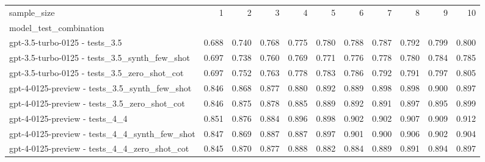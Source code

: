 \begin{tabular}{lrrrrrrrrrr}
\toprule
sample_size & 1 & 2 & 3 & 4 & 5 & 6 & 7 & 8 & 9 & 10 \\
model_test_combination &  &  &  &  &  &  &  &  &  &  \\
\midrule
gpt-3.5-turbo-0125 - tests_3.5 & 0.688 & 0.740 & 0.768 & 0.775 & 0.780 & 0.788 & 0.787 & 0.792 & 0.799 & 0.800 \\
gpt-3.5-turbo-0125 - tests_3.5_synth_few_shot & 0.697 & 0.738 & 0.760 & 0.769 & 0.771 & 0.776 & 0.778 & 0.780 & 0.784 & 0.785 \\
gpt-3.5-turbo-0125 - tests_3.5_zero_shot_cot & 0.697 & 0.752 & 0.763 & 0.778 & 0.783 & 0.786 & 0.792 & 0.791 & 0.797 & 0.805 \\
gpt-4-0125-preview - tests_3.5_synth_few_shot & 0.846 & 0.868 & 0.877 & 0.880 & 0.892 & 0.889 & 0.898 & 0.898 & 0.900 & 0.897 \\
gpt-4-0125-preview - tests_3.5_zero_shot_cot & 0.846 & 0.875 & 0.878 & 0.885 & 0.889 & 0.892 & 0.891 & 0.897 & 0.895 & 0.899 \\
gpt-4-0125-preview - tests_4_4 & 0.851 & 0.876 & 0.884 & 0.896 & 0.898 & 0.902 & 0.902 & 0.907 & 0.909 & 0.912 \\
gpt-4-0125-preview - tests_4_4_synth_few_shot & 0.847 & 0.869 & 0.887 & 0.887 & 0.897 & 0.901 & 0.900 & 0.906 & 0.902 & 0.904 \\
gpt-4-0125-preview - tests_4_4_zero_shot_cot & 0.845 & 0.870 & 0.877 & 0.888 & 0.882 & 0.884 & 0.889 & 0.891 & 0.894 & 0.897 \\
\bottomrule
\end{tabular}

